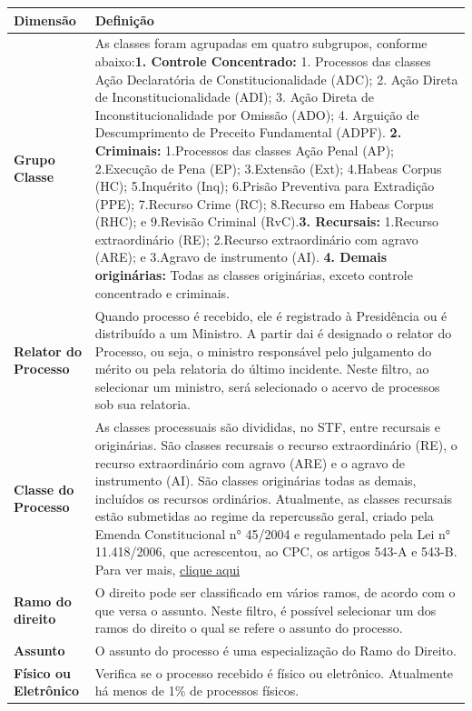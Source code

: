 \documentclass[
]{book}
\begin{document}
\begin{longtable}[]{@{}
  >{\raggedright\arraybackslash}p{}
  >{\raggedright\arraybackslash}p{}@{}}
\toprule
Dimensão & Definição \\
\midrule
\endhead
\textbf{Grupo Classe} & As classes foram agrupadas em quatro subgrupos, conforme abaixo:\textbf{1. Controle Concentrado:} 1. Processos das classes Ação Declaratória de Constitucionalidade (ADC); 2. Ação Direta de Inconstitucionalidade (ADI); 3. Ação Direta de Inconstitucionalidade por Omissão (ADO); 4. Arguição de Descumprimento de Preceito Fundamental (ADPF). \textbf{2. Criminais:} 1.Processos das classes Ação Penal (AP); 2.Execução de Pena (EP); 3.Extensão (Ext); 4.Habeas Corpus (HC); 5.Inquérito (Inq); 6.Prisão Preventiva para Extradição (PPE); 7.Recurso Crime (RC); 8.Recurso em Habeas Corpus (RHC); e 9.Revisão Criminal (RvC).\textbf{3. Recursais:} 1.Recurso extraordinário (RE); 2.Recurso extraordinário com agravo (ARE); e 3.Agravo de instrumento (AI). \textbf{4. Demais originárias:} Todas as classes originárias, exceto controle concentrado e criminais. \\
\textbf{Relator do Processo} & Quando processo é recebido, ele é registrado à Presidência ou é distribuído a um Ministro. A partir dai é designado o relator do Processo, ou seja, o ministro responsável pelo julgamento do mérito ou pela relatoria do último incidente. Neste filtro, ao selecionar um ministro, será selecionado o acervo de processos sob sua relatoria. \\
\textbf{Classe do Processo} & As classes processuais são divididas, no STF, entre recursais e originárias. São classes recursais o recurso extraordinário (RE), o recurso extraordinário com agravo (ARE) e o agravo de instrumento (AI). São classes originárias todas as demais, incluídos os recursos ordinários. Atualmente, as classes recursais estão submetidas ao regime da repercussão geral, criado pela Emenda Constitucional n° 45/2004 e regulamentado pela Lei n° 11.418/2006, que acrescentou, ao CPC, os artigos 543-A e 543-B. Para ver mais, \href{https://app.gitbook.com/@glossario/s/glossario/~/drafts/-MegelAClcCRkkC6ve2p/v/master/introducao/o-que-e-possivel-pesquisar/classes-processuais}{clique aqui} \\
\textbf{Ramo do direito} & O direito pode ser classificado em vários ramos, de acordo com o que versa o assunto. Neste filtro, é possível selecionar um dos ramos do direito o qual se refere o assunto do processo. \\
\textbf{Assunto} & O assunto do processo é uma especialização do Ramo do Direito. \\
\textbf{Físico ou Eletrônico} & Verifica se o processo recebido é físico ou eletrônico. Atualmente há menos de 1\% de processos físicos. \\
\bottomrule
\end{longtable}
\end{document}
